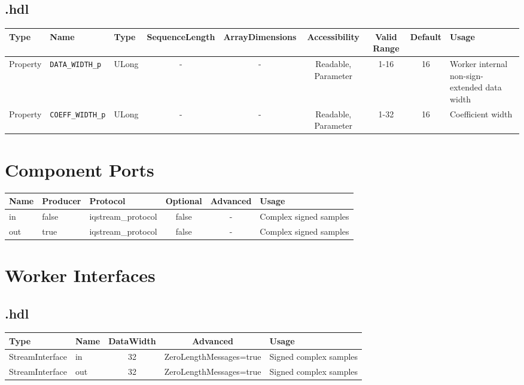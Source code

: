 \begin{landscape}
	\subsection*{\comp.hdl}
	\begin{scriptsize}
		\begin{tabular}{|p{3cm}|p{2cm}|p{1cm}|c|c|c|c|c|p{5cm}|}
			\hline
			\rowcolor{blue}
			Type     & Name                 & Type  & SequenceLength & ArrayDimensions & Accessibility       & Valid Range & Default & Usage                                        \\
			\hline
			Property & \verb+DATA_WIDTH_p+  & ULong & -              & -               & Readable, Parameter & 1-16        & 16      & Worker internal non-sign-extended data width \\
			\hline
			Property & \verb+COEFF_WIDTH_p+ & ULong & -              & -               & Readable, Parameter & 1-32        & 16      & Coefficient width                            \\
			\hline
		\end{tabular}
	\end{scriptsize}


	\section*{Component Ports}
	\begin{scriptsize}
		\begin{tabular}{|M{2cm}|M{1.5cm}|M{4cm}|c|c|M{9cm}|}
			\hline
			\rowcolor{blue}
			Name & Producer & Protocol           & Optional & Advanced & Usage                  \\
			\hline
			in   & false    & iqstream\_protocol & false    & -        & Complex signed samples \\
			\hline
			out  & true     & iqstream\_protocol & false    & -        & Complex signed samples \\
			\hline
		\end{tabular}
	\end{scriptsize}

	\section*{Worker Interfaces}
	\subsection*{\comp.hdl}
	\begin{scriptsize}
		\begin{tabular}{|M{2cm}|M{1.5cm}|c|c|M{12cm}|}
			\hline
			Type            & Name & DataWidth & Advanced                & Usage                  \\
			\hline
			StreamInterface & in   & 32        & ZeroLengthMessages=true & Signed complex samples \\
			\hline
			StreamInterface & out  & 32        & ZeroLengthMessages=true & Signed complex samples \\
			\hline
		\end{tabular}
	\end{scriptsize}
\end{landscape}


